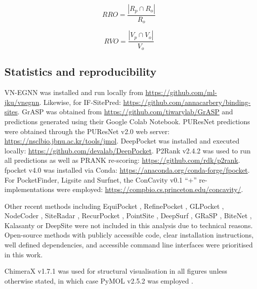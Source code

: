 \begin{equation}
RRO = \frac{|R_p \cap R_o|}{R_o}
\label{eq:RRO}
\end{equation}

\begin{equation}
RVO = \frac{|V_p \cap V_o|}{V_o}
\label{eq:RVO}
\end{equation}

\subsection{Statistics and reproducibility}

VN-EGNN was installed and run locally from \url{https://github.com/ml-jku/vnegnn}. Likewise, for IF-SitePred: \url{https://github.com/annacarbery/binding-sites}. GrASP was obtained from \url{https://github.com/tiwarylab/GrASP} and predictions generated using their Google Colab Notebook. PUResNet predictions were obtained through the PUResNet v2.0 web server: \url{https://nsclbio.jbnu.ac.kr/tools/jmol}. DeepPocket was installed and executed locally: \url{https://github.com/devalab/DeepPocket}. P2Rank v2.4.2 was used to run all predictions as well as PRANK re-scoring: \url{https://github.com/rdk/p2rank}. fpocket v4.0 was installed via Conda: \url{https://anaconda.org/conda-forge/fpocket}. For PocketFinder, Ligsite and Surfnet, the ConCavity v0.1 ``+'' re-implementations were employed: \url{https://compbio.cs.princeton.edu/concavity/}.

Other recent methods including  EquiPocket \cite{YAN_2024_EQUIPOCKET}, RefinePocket \cite{LIU_2023_REFINEPOCKET}, GLPocket \cite{LI_2023_GLPOCKET}, NodeCoder \cite{ABDOLLAHI_2023_NODECODER}, SiteRadar \cite{EVTEEV_2023_SITERADAR}, RecurPocket \cite{LI_2022_RECURPOCKET}, PointSite \cite{YAN_2022_POINTSITE}, DeepSurf \cite{MYOLNAS_2021_DEEPSURF}, GRaSP \cite{SANTANA_2020_GRaSP}, BiteNet \cite{KOZLOVSKII_2020_BITENET}, Kalasanty \cite{STEPNIEWSKA_2020_KALASANTY} or DeepSite \cite{JIMENEZ_2017_DEEPSITE} were not included in this analysis due to technical reasons. Open-source methods with publicly accessible code, clear installation instructions, well defined dependencies, and accessible command line interfaces were prioritised in this work.

ChimeraX v1.7.1 \cite{PETTERSEN_2021_CHIMERAX} was used for structural visualisation in all figures unless otherwise stated, in which case PyMOL v2.5.2 was employed \cite{SCHRODINGER_2015_PYMOL}.


